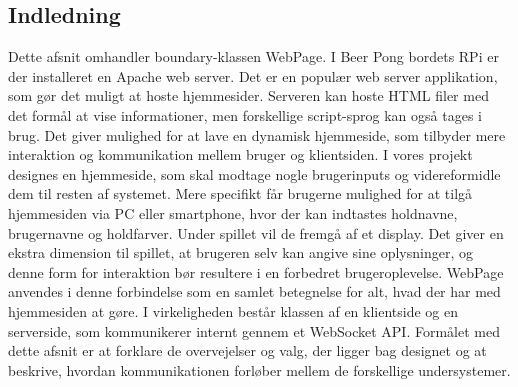 \documentclass[Softwaredesign/Softwaredesign_main.tex]{subfiles}
\begin{document}
\subsection{Indledning}
Dette afsnit omhandler boundary-klassen WebPage. I Beer Pong bordets RPi er der installeret en Apache web server. Det er en populær web server applikation, som gør det muligt at hoste hjemmesider. Serveren kan hoste HTML filer med det formål at vise informationer, men forskellige script-sprog kan også tages i brug. Det giver mulighed for at lave en dynamisk hjemmeside, som tilbyder mere interaktion og kommunikation mellem bruger og klientsiden. I vores projekt designes en hjemmeside, som skal modtage nogle brugerinputs og videreformidle dem til resten af systemet. Mere specifikt får brugerne mulighed for at tilgå hjemmesiden via PC eller smartphone, hvor der kan indtastes holdnavne, brugernavne og holdfarver. Under spillet vil de fremgå af et display. Det giver en ekstra dimension til spillet, at brugeren selv kan angive sine oplysninger, og denne form for interaktion bør resultere i en forbedret brugeroplevelse. WebPage anvendes i denne forbindelse som en samlet betegnelse for alt, hvad der har med hjemmesiden at gøre. I virkeligheden består klassen af en klientside og en serverside, som kommunikerer internt gennem et WebSocket API. Formålet med dette afsnit er at forklare de overvejelser og valg, der ligger bag designet og at beskrive, hvordan kommunikationen forløber mellem de forskellige undersystemer.
\end{document}

